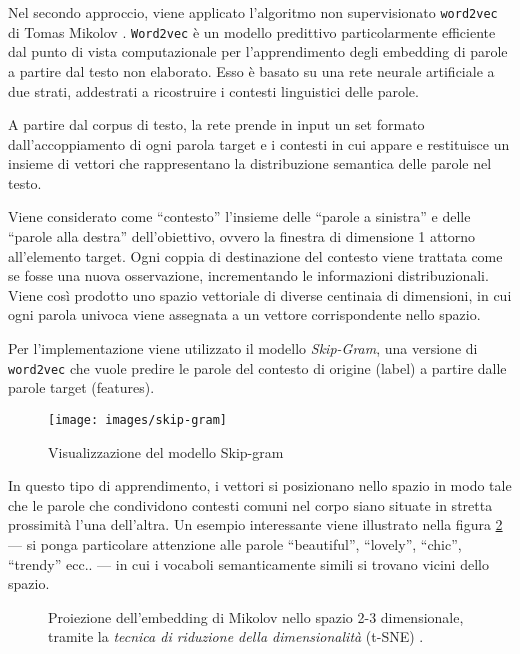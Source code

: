 Nel secondo approccio, viene applicato l'algoritmo non supervisionato \texttt{word2vec} di Tomas Mikolov  \cite{mikolov2013efficient}. 
\texttt{Word2vec} è un modello predittivo particolarmente efficiente dal punto di vista computazionale per l'apprendimento degli embedding di parole a partire dal testo non elaborato.
Esso è basato su una rete neurale artificiale a due strati, addestrati a ricostruire i contesti linguistici delle parole. 

A partire dal corpus di testo, la rete prende in input un set formato dall'accoppiamento di ogni parola target e i contesti in cui appare e restituisce un insieme di vettori che rappresentano la distribuzione semantica delle parole nel testo. 

Viene considerato come ``contesto'' l'insieme delle ``parole a sinistra'' e delle ``parole alla destra'' dell'obiettivo, ovvero la finestra di dimensione 1 attorno all'elemento target. Ogni coppia di destinazione del contesto viene trattata come se fosse una nuova osservazione, incrementando le informazioni distribuzionali. Viene così prodotto uno spazio vettoriale di diverse centinaia di dimensioni, in cui ogni parola univoca viene assegnata a un vettore corrispondente nello spazio.

Per l'implementazione viene utilizzato il modello \emph{Skip-Gram}, una versione di \texttt{word2vec} che vuole predire le parole del contesto di origine (label) a partire dalle parole target (features).

\begin{figure}[H]
	\centering
	{\texttt{[image: images/skip-gram]}} 
	\caption{Visualizzazione del modello Skip-gram}
	\label{fig:mikolov}
\end{figure}

In questo tipo di apprendimento, i vettori si posizionano nello spazio in modo tale che le parole che condividono contesti comuni nel corpo siano situate in stretta prossimità l'una dell'altra. Un esempio interessante viene illustrato nella figura \ref{fig:embedding1} --- si ponga particolare attenzione alle parole ``beautiful'', ``lovely'', ``chic'', ``trendy'' ecc.. --- in cui i vocaboli semanticamente simili si trovano vicini dello spazio.

\begin{figure}[H]
	\centering
	\hspace{10mm}
	
	\caption{Proiezione dell'embedding di Mikolov nello spazio 2-3 dimensionale, tramite la \emph{tecnica di riduzione della dimensionalità} (t-SNE) \cite{maaten2008visualizing}.}
	\label{fig:embedding1}
\end{figure}

